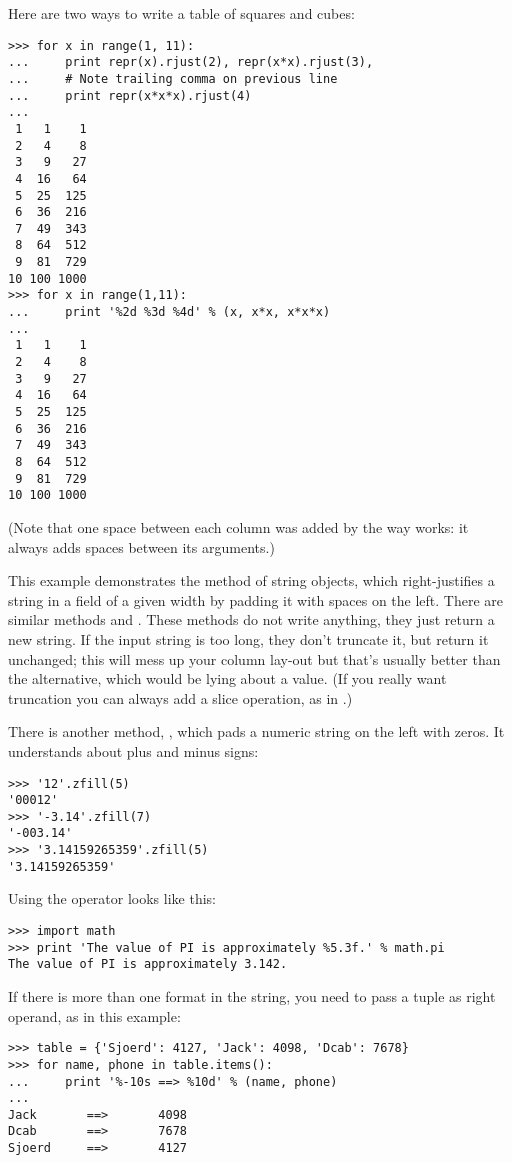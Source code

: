 \documentclass{manual}
\begin{document}
Here are two ways to write a table of squares and cubes:

\begin{verbatim}
>>> for x in range(1, 11):
...     print repr(x).rjust(2), repr(x*x).rjust(3),
...     # Note trailing comma on previous line
...     print repr(x*x*x).rjust(4)
...
 1   1    1
 2   4    8
 3   9   27
 4  16   64
 5  25  125
 6  36  216
 7  49  343
 8  64  512
 9  81  729
10 100 1000
>>> for x in range(1,11):
...     print '%2d %3d %4d' % (x, x*x, x*x*x)
... 
 1   1    1
 2   4    8
 3   9   27
 4  16   64
 5  25  125
 6  36  216
 7  49  343
 8  64  512
 9  81  729
10 100 1000
\end{verbatim}

(Note that one space between each column was added by the way
 works: it always adds spaces between its arguments.)

This example demonstrates the  method of string objects,
which right-justifies a string in a field of a given width by padding
it with spaces on the left.  There are similar methods
 and .  These
methods do not write anything, they just return a new string.  If
the input string is too long, they don't truncate it, but return it
unchanged; this will mess up your column lay-out but that's usually
better than the alternative, which would be lying about a value.  (If
you really want truncation you can always add a slice operation, as in
.)

There is another method, , which pads a
numeric string on the left with zeros.  It understands about plus and
minus signs:

\begin{verbatim}
>>> '12'.zfill(5)
'00012'
>>> '-3.14'.zfill(7)
'-003.14'
>>> '3.14159265359'.zfill(5)
'3.14159265359'
\end{verbatim}

Using the \code{\%} operator looks like this:

\begin{verbatim}
>>> import math
>>> print 'The value of PI is approximately %5.3f.' % math.pi
The value of PI is approximately 3.142.
\end{verbatim}

If there is more than one format in the string, you need to pass a
tuple as right operand, as in this example:

\begin{verbatim}
>>> table = {'Sjoerd': 4127, 'Jack': 4098, 'Dcab': 7678}
>>> for name, phone in table.items():
...     print '%-10s ==> %10d' % (name, phone)
... 
Jack       ==>       4098
Dcab       ==>       7678
Sjoerd     ==>       4127
\end{verbatim}
\end{document}
